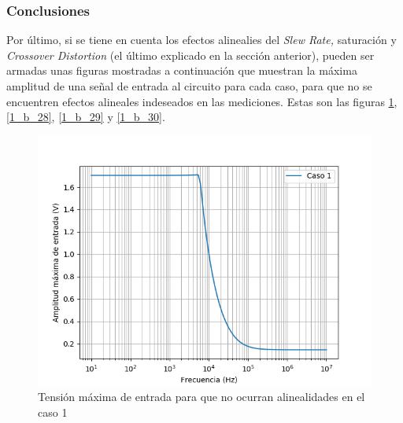 \subsubsection{Conclusiones}

Por último, si se tiene en cuenta los efectos alinealies del \emph{Slew
Rate, }saturación y \emph{Crossover Distortion} (el último explicado
en la sección anterior), pueden ser armadas unas figuras mostradas
a continuación que muestran la máxima amplitud de una señal de entrada
al circuito para cada caso, para que no se encuentren efectos alineales
indeseados en las mediciones. Estas son las figuras \ref{1_b_27},
\ref{1_b_28}, \ref{1_b_29} y \ref{1_b_30}.

\begin{figure}[H]
\begin{centering}
\includegraphics[scale=0.5]{../Ex1/iB/Resources1b/AmplMaxVsFreq1}
\par\end{centering}
\caption{Tensión máxima de entrada para que no ocurran alinealidades en el
caso 1}
\label{1_b_27}

\end{figure}

